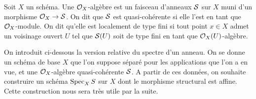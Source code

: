 \begin{defn}[$\Oo_X$-algèbre]
Soit $X$ un schéma. Une $\Oo_X$-algèbre est un faisceau d'anneaux $\mathcal{S}$ sur $X$ muni d'un morphisme $\mathcal{O}_X\rightarrow \mathcal{S}$. On dit que $\mathcal{S}$ est quasi-cohérente si elle l'est en tant que $\Oo_X$-module. On dit qu'elle est localement de type fini si tout point $x\in X$ admet un voisinage ouvert $U$ tel que $\mathcal{S}(U)$ soit de type fini en tant que $\mathcal{O}_X(U)$-algèbre.
\end{defn}

On introduit ci-dessous la version relative du spectre d'un anneau. On se donne un schéma de base $X$ que l'on suppose séparé pour les applications que l'on a en vue, et une $\Oo_X$-algèbre quasi-cohérente $\mathcal{S}$. A partir de ces données, on souhaite construire un schéma $\operatorname{Spec}_X S$ sur $X$ dont le morphisme structural est affine. Cette construction nous sera très utile par la suite.

